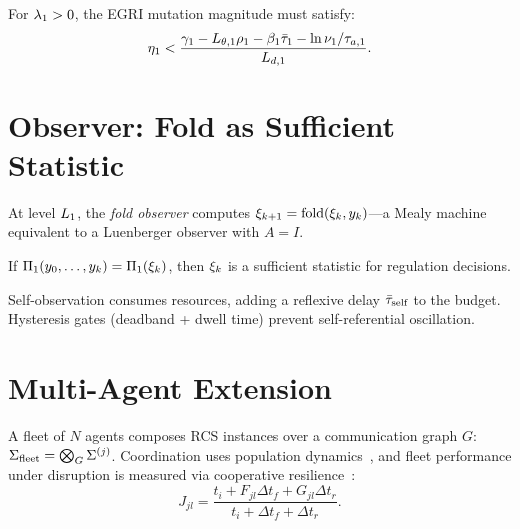 \documentclass[conference]{IEEEtran}
\begin{document}
\begin{proposition}
For $\lambda_1 > 0$, the EGRI mutation magnitude must satisfy:
\begin{equation}
  \eta_1 < \frac{\decay_1 - L_{\param,1}\rho_1 - \beta_1\taubar_1
  - \ln\nu_1/\taua[1]}{L_{d,1}}.
\end{equation}
\end{proposition}

\section{Observer: Fold as Sufficient Statistic}
\label{sec:observer}

\begin{definition}
At level $L_{1}$, the \emph{fold observer} computes
$\xi_{k+1} = \text{fold}(\xi_k, y_k)$---a Mealy machine
equivalent to a Luenberger observer with $A = I$.
\end{definition}

\begin{proposition}[Sufficiency]
If $\Pi_1(y_0, \ldots, y_k) = \Pi_1(\xi_k)$, then $\xi_k$
is a sufficient statistic for regulation decisions.
\end{proposition}

Self-observation consumes resources, adding a reflexive delay
$\bar{\tau}_{\text{self}}$ to the budget.  Hysteresis gates (deadband + dwell
time) prevent self-referential oscillation.

\section{Multi-Agent Extension}
\label{sec:fleet}

A fleet of $N$ agents composes RCS instances over a communication graph
$G$: $\Sigma_{\text{fleet}} = \bigotimes_G \Sigma^{(j)}$.  Coordination uses
population dynamics~\cite{quijano2017population}, and fleet performance under
disruption is measured via cooperative
resilience~\cite{chacon2025cooperative}:
\begin{equation}
  J_{jl} = \frac{t_i + F_{jl}\Delta t_f + G_{jl}\Delta t_r}
  {t_i + \Delta t_f + \Delta t_r}.
\end{equation}
\end{document}
